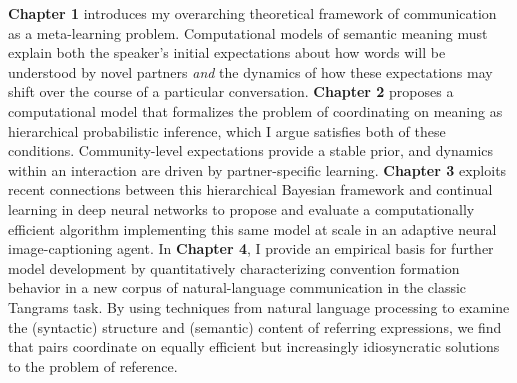 \textbf{Chapter 1} introduces my overarching theoretical framework of communication as a meta-learning problem. 
Computational models of semantic meaning must explain both the speaker's initial expectations about how words will be understood by novel partners \emph{and} the dynamics of how these expectations may shift over the course of a particular conversation. %
\textbf{Chapter 2} proposes a computational model that formalizes the problem of coordinating on meaning as hierarchical probabilistic inference, which I argue satisfies both of these conditions.
Community-level expectations provide a stable prior, and dynamics within an interaction are driven by partner-specific learning.
\textbf{Chapter 3} exploits recent connections between this hierarchical Bayesian framework and continual learning in deep neural networks to propose and evaluate a computationally efficient algorithm implementing this same model at scale in an adaptive neural image-captioning agent.
In \textbf{Chapter 4}, I provide an empirical basis for further model development by quantitatively characterizing convention formation behavior in a new corpus of natural-language communication in the classic Tangrams task. %
By using techniques from natural language processing to examine the (syntactic) structure and (semantic) content of referring expressions, we find that pairs coordinate on equally efficient but increasingly idiosyncratic solutions to the problem of reference. %

